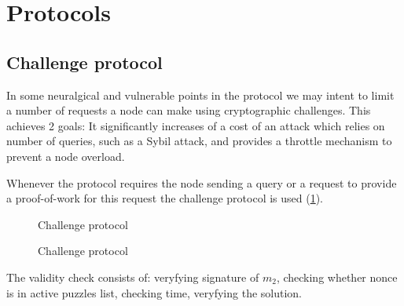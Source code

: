 \section{Protocols}
\subsection{Challenge protocol}
In some neuralgical and vulnerable points in the protocol we may intent to limit
a number of requests a node can make using cryptographic challenges. This
achieves 2 goals: It significantly increases of a cost of an attack which relies
on number of queries, such as a Sybil attack, and provides a throttle mechanism
to prevent a node overload.

Whenever the protocol requires the node sending a query or a request to provide
a proof-of-work for this request the challenge protocol is used
(\ref{fig:chal_prot}).

\begin{figure}
\begin{msc}{Challenge protocol}
\setlength{\instdist}{9cm}
\setlength{\envinstdist}{3cm}
\nextlevel
{}
\nextlevel[11]
\nextlevel[1]
\nextlevel[4]
\nextlevel
{}
\nextlevel[4]
\end{msc}
  \caption{Challenge protocol}
  \label{fig:chal_prot}
\end{figure}

The validity check consists of: veryfying signature of $m_2$, checking whether
nonce is in active puzzles list, checking time, veryfying the solution.

